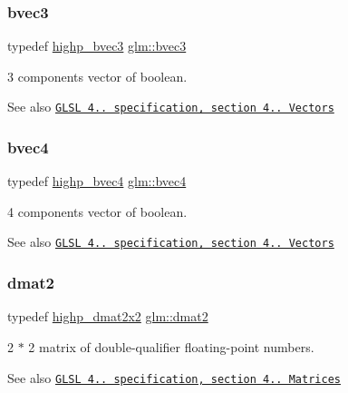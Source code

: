 \subsubsection{\texorpdfstring{bvec3}{bvec3}}
{\footnotesize\ttfamily typedef \hyperlink{group__core__precision_ga0e3365e13160aa93d2a9c68529a013ce}{highp\+\_\+bvec3} \hyperlink{group__core__types_ga3f07d6d37fc6fe875170fd5799685bcf}{glm\+::bvec3}}

3 components vector of boolean.

\begin{DoxySeeAlso}{See also}
\href{http://www.opengl.org/registry/doc/GLSLangSpec.4.20.8.pdf}{\tt G\+L\+SL 4.. specification, section 4.. Vectors} 
\end{DoxySeeAlso}
\mbox{\label{group__core__types_ga6bb211b3d3bebae3867548d5673ca5cd}} 
\subsubsection{\texorpdfstring{bvec4}{bvec4}}
{\footnotesize\ttfamily typedef \hyperlink{group__core__precision_gaa99e0301060bf06e7750c1c3591b6b4e}{highp\+\_\+bvec4} \hyperlink{group__core__types_ga6bb211b3d3bebae3867548d5673ca5cd}{glm\+::bvec4}}

4 components vector of boolean.

\begin{DoxySeeAlso}{See also}
\href{http://www.opengl.org/registry/doc/GLSLangSpec.4.20.8.pdf}{\tt G\+L\+SL 4.. specification, section 4.. Vectors} 
\end{DoxySeeAlso}
\mbox{\label{group__core__types_gad8c130d26c4cd9a1a831c1a74292a8f6}} 
\subsubsection{\texorpdfstring{dmat2}{dmat2}}
{\footnotesize\ttfamily typedef \hyperlink{group__core__precision_gad08aec6bf6b5ae7d486fbabb3b28f904}{highp\+\_\+dmat2x2} \hyperlink{group__core__types_gad8c130d26c4cd9a1a831c1a74292a8f6}{glm\+::dmat2}}

2 $\ast$ 2 matrix of double-\/qualifier floating-\/point numbers.

\begin{DoxySeeAlso}{See also}
\href{http://www.opengl.org/registry/doc/GLSLangSpec.4.20.8.pdf}{\tt G\+L\+SL 4.. specification, section 4.. Matrices} 
\end{DoxySeeAlso}
\mbox{\label{group__core__types_gae9932771e11a4f38e21f1136423bab18}} 
